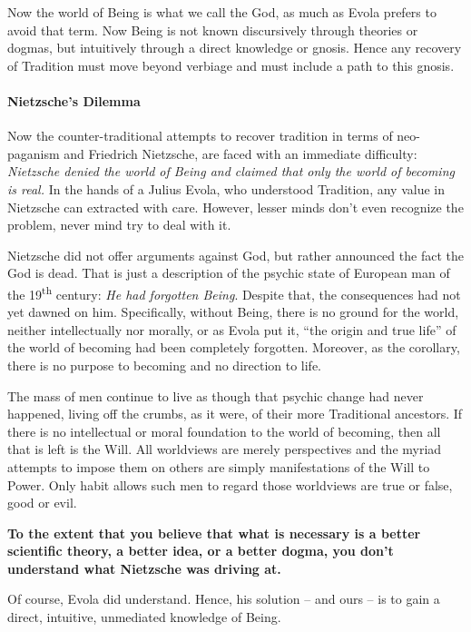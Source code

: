 Now the world of Being is what we call the God, as much as Evola prefers to avoid that term. Now Being is not known discursively through theories or dogmas, but intuitively through a direct knowledge or gnosis. Hence any recovery of Tradition must move beyond verbiage and must include a path to this gnosis.

\paragraph{Nietzsche's Dilemma}


Now the counter-traditional attempts to recover tradition in terms of neo-paganism and Friedrich Nietzsche, are faced with an immediate difficulty: \emph{Nietzsche denied the world of Being and claimed that only the world of becoming is real.} In the hands of a Julius Evola, who understood Tradition, any value in Nietzsche can extracted with care. However, lesser minds don't even recognize the problem, never mind try to deal with it.

Nietzsche did not offer arguments against God, but rather announced the fact the God is dead. That is just a description of the psychic state of European man of the 19\textsuperscript{th} century: \emph{He had forgotten Being}. Despite that, the consequences had not yet dawned on him. Specifically, without Being, there is no ground for the world, neither intellectually nor morally, or as Evola put it, ``the origin and true life'' of the world of becoming had been completely forgotten. Moreover, as the corollary, there is no purpose to becoming and no direction to life.

The mass of men continue to live as though that psychic change had never happened, living off the crumbs, as it were, of their more Traditional ancestors. If there is no intellectual or moral foundation to the world of becoming, then all that is left is the Will. All worldviews are merely perspectives and the myriad attempts to impose them on others are simply manifestations of the Will to Power. Only habit allows such men to regard those worldviews are true or false, good or evil.

\textbf{To the extent that you believe that what is necessary is a better scientific theory, a better idea, or a better dogma, you don't understand what Nietzsche was driving at.}

Of course, Evola did understand. Hence, his solution -- and ours -- is to gain a direct, intuitive, unmediated knowledge of Being.


